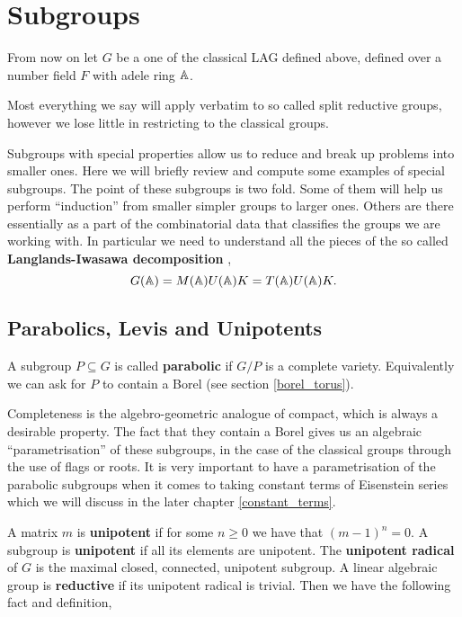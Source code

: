 \section{Subgroups}
From now on let \(G\) be a one of the classical LAG defined above, defined over a number field \(F\) with adele ring \(\A\).
\begin{remark}
	Most everything we say will apply verbatim to so called split reductive groups, however we lose little in restricting to the classical groups.
\end{remark}

Subgroups with special properties allow us to reduce and break up problems into smaller ones. Here we will briefly review and compute some examples of special subgroups. The point of these subgroups is two fold. Some of them will help us perform ``induction'' from smaller simpler groups to larger ones. Others are there essentially as a part of the combinatorial data that classifies the groups we are working with. In particular we need to understand all the pieces of the so called \textbf{Langlands-Iwasawa decomposition} \cite[2.7]{getzIntroductionAutomorphicRepresentations2024},
\begin{equation}\label{eq:iwasawa_decomposition}
    G(\A) = M(\A)U(\A) K = T(\A)U(\A)K.
\end{equation}

\subsection{Parabolics, Levis and Unipotents}
A subgroup \(P\subseteq G\) is called \textbf{parabolic} if \(G/P\) is a complete variety. Equivalently we can ask for \(P\) to contain a Borel (see section \ref{borel_torus}).

Completeness is the algebro-geometric analogue of compact, which is always a desirable property. The fact that they contain a Borel gives us an algebraic ``parametrisation'' of these subgroups, in the case of the classical groups through the use of flags or roots. It is very important to have a parametrisation of the parabolic subgroups when it comes to taking constant terms of Eisenstein series which we will discuss in the later chapter \ref{constant_terms}.

\label{unipotent_radical_definition}
A matrix \(m\) is \textbf{unipotent} if for some \(n\geq 0\) we have that \((m-1)^n = 0\). A subgroup is \textbf{unipotent} if all its elements are unipotent. The \textbf{unipotent radical} of \(G\) is the maximal closed, connected, unipotent subgroup. A linear algebraic group is \textbf{reductive} if its unipotent radical is trivial. Then we have the following fact and definition,

